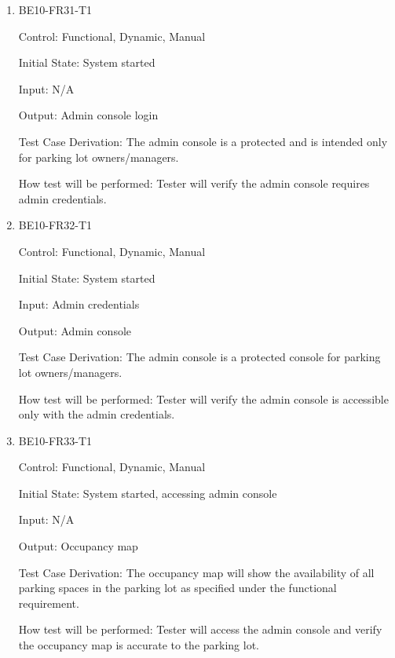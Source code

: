 \documentclass[12pt, titlepage]{article}
\begin{document}
\begin{enumerate}

    \item{BE10-FR31-T1}

    Control: Functional, Dynamic, Manual
    					
    Initial State: System started
    					
    Input: N/A
    					
    Output: Admin console login
    
    Test Case Derivation: The admin console is a protected and is intended only
    for parking lot owners/managers.
    					
    How test will be performed: Tester will verify the admin console requires
    admin credentials.

    \item{BE10-FR32-T1}

    Control: Functional, Dynamic, Manual
    					
    Initial State: System started
    					
    Input: Admin credentials
    					
    Output: Admin console
    
    Test Case Derivation: The admin console is a protected console for parking
    lot owners/managers.
    					
    How test will be performed: Tester will verify the admin console is
    accessible only with the admin credentials.

    \item{BE10-FR33-T1}

    Control: Functional, Dynamic, Manual
    					
    Initial State: System started, accessing admin console
    					
    Input: N/A
    					
    Output: Occupancy map
    
    Test Case Derivation: The occupancy map will show the availability of all
    parking spaces in the parking lot as specified under the functional
    requirement.
    					
    How test will be performed: Tester will access the admin console and verify
    the occupancy map is accurate to the parking lot.
\end{enumerate}
\end{document}
